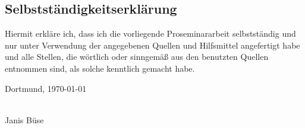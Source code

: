 




\tableofcontents
\clearpage
{}


%





%

%
\printbibliography
%
\clearpage

\thispagestyle{myheadings}  
\thispagestyle{empty}
\subsection*{Selbstständigkeitserklärung}
Hiermit erkläre ich, dass ich die vorliegende Proseminararbeit selbstständig und nur unter Verwendung der angegebenen Quellen und Hilfsmittel angefertigt habe und alle Stellen, die wörtlich oder sinngemäß aus den benutzten Quellen entnommen sind, als solche kenntlich gemacht habe. 

\vspace{1cm}

\noindent Dortmund, \today \hfill \parbox[t]{8cm}{\dotfill\\
    \vspace{-0.7cm}\center Janis Büse}

\cleardoublepage 


